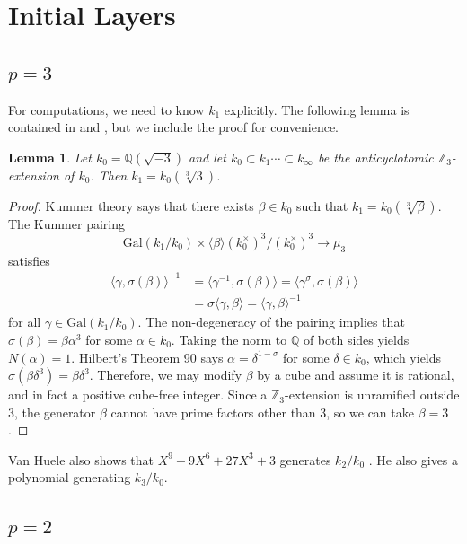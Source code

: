 \documentclass{amsart}
\newtheorem{lemma}[theorem]{Lemma}
\begin{document}
\section{Initial Layers}

\subsection{$p=3$}

For computations, we need to know $k_1$ explicitly. The following lemma is contained in \cite{Oh-Kim} and \cite{VH}, 
but we include the proof for convenience.
\begin{lemma}\label{LemmaKummer}   Let $k_0=\mathbb Q(\sqrt{-3})$ and let $k_0\subset k_1 \cdots \subset k_{\infty}$
be the anticyclotomic $\mathbb Z_3$-extension of $k_0$. Then $k_1=k_0(\sqrt[3]{3})$.\end{lemma}
\begin{proof} Kummer theory says that there exists $\beta\in k_0$ such that $k_1=k_0(\sqrt[3]{\beta})$. 
The Kummer pairing
$$
\text{Gal}(k_1/k_0) \times \langle \beta\rangle (k_0^{\times})^3/(k_0^{\times})^3 \rightarrow \mu_3
$$
satisfies 
\begin{align*}
\langle \gamma, \sigma(\beta)\rangle^{-1}&=\langle \gamma^{-1}, \sigma(\beta)\rangle=\langle \gamma^{\sigma}, \sigma(\beta)\rangle\\
 &= \sigma \langle \gamma, \beta \rangle = \langle \gamma, \beta \rangle^{-1}
\end{align*}
for all $\gamma\in \text{Gal}(k_1/k_0)$. The non-degeneracy of the pairing implies that 
$\sigma(\beta) = \beta \alpha^3$ for some $\alpha\in k_0$. Taking the norm to $\mathbb Q$ of both sides yields $N(\alpha)=1$.
Hilbert's Theorem 90 says $\alpha=\delta^{1-\sigma}$ for some $\delta\in k_0$, which yields $\sigma(\beta\delta^3) = \beta\delta^3$.
Therefore, we may modify $\beta$ by a cube and assume it is rational, and in  fact a positive cube-free integer. 
Since a $\mathbb Z_3$-extension is unramified outside 3, the generator $\beta$ 
cannot have prime factors other than 3, so we can take $\beta=3$.\end{proof}

Van Huele \cite{VH} also shows that $X^9+9X^6+27X^3+3$ generates $k_2/k_0$ . He also gives a polynomial generating $k_3/k_0$.

\subsection{$p=2$}
\end{document}
